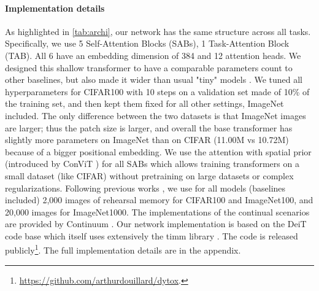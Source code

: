 \paragraph{Implementation details} As highlighted in \autoref{tab:archi}, our network has the same
structure across all tasks. Specifically, we use 5 Self-Attention Blocks (SABs), 1 Task-Attention
Block (TAB). All 6 have an embedding dimension of 384 and 12 attention heads. We designed this
shallow transformer to have a comparable parameters count to other baselines, but also made it wider
than usual "tiny" models \citep{dosovitskiy2020vit,touvron2021deit,touvron2021cait}. We tuned all
hyperparameters for CIFAR100 with 10 steps on a validation set made of 10\% of the training set, and
then kept them fixed for all other settings, ImageNet included. The only difference between the two
datasets is that ImageNet images are larger; thus the patch size is larger, and overall the base
transformer has slightly more parameters on ImageNet than on CIFAR (11.00M vs 10.72M) because of a
bigger positional embedding. We use the attention with spatial prior (introduced by ConViT
\citep{dascoli2021convit}) for all SABs which allows training transformers on a small dataset (like
CIFAR) without pretraining on large datasets or complex regularizations. Following previous works
\citep{rebuffi2017icarl,yan2021der}, we use for all models (baselines included) 2,000 images of
rehearsal memory for CIFAR100 and ImageNet100, and 20,000 images for ImageNet1000. The
implementations of the continual scenarios are provided by Continuum
\citep{douillardlesort2021continuum}. Our network implementation is based on the DeiT
\citep{touvron2021deit} code base which itself uses extensively the timm library
\citep{wightman2019timm}. The code is released
publicly\footnote{\footnotesize{\url{https://github.com/arthurdouillard/dytox}.}}. The full
implementation details are in the appendix.


